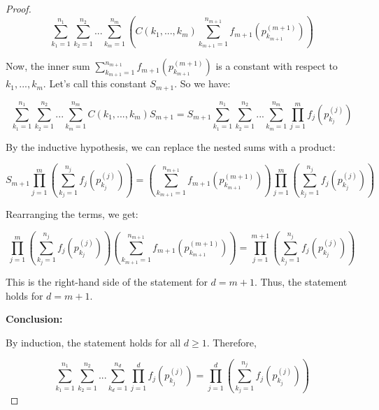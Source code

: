 \begin{proof}
$$
\sum_{k_1=1}^{n_1} \sum_{k_2=1}^{n_2} ... \sum_{k_m=1}^{n_m}  \left( C(k_1, ..., k_m) \sum_{k_{m+1}=1}^{n_{m+1}} f_{m+1}(p_{k_{m+1}}^{(m+1)}) \right)
$$

Now, the inner sum $\sum_{k_{m+1}=1}^{n_{m+1}} f_{m+1}(p_{k_{m+1}}^{(m+1)})$ is a constant with respect to $k_1, ..., k_m$. Let's call this constant $S_{m+1}$. So we have:

$$
\sum_{k_1=1}^{n_1} \sum_{k_2=1}^{n_2} ... \sum_{k_m=1}^{n_m} C(k_1, ..., k_m) S_{m+1} = S_{m+1} \sum_{k_1=1}^{n_1} \sum_{k_2=1}^{n_2} ... \sum_{k_m=1}^{n_m}  \prod_{j=1}^m f_j(p_{k_j}^{(j)})
$$

By the inductive hypothesis, we can replace the nested sums with a product:

$$
S_{m+1} \prod_{j=1}^m \left( \sum_{k_j=1}^{n_j} f_j(p_{k_j}^{(j)}) \right) = \left( \sum_{k_{m+1}=1}^{n_{m+1}} f_{m+1}(p_{k_{m+1}}^{(m+1)}) \right) \prod_{j=1}^m \left( \sum_{k_j=1}^{n_j} f_j(p_{k_j}^{(j)}) \right)
$$

Rearranging the terms, we get:

$$
\prod_{j=1}^m \left( \sum_{k_j=1}^{n_j} f_j(p_{k_j}^{(j)}) \right) \left( \sum_{k_{m+1}=1}^{n_{m+1}} f_{m+1}(p_{k_{m+1}}^{(m+1)}) \right) = \prod_{j=1}^{m+1} \left( \sum_{k_j=1}^{n_j} f_j(p_{k_j}^{(j)}) \right)
$$

This is the right-hand side of the statement for $d = m+1$. Thus, the statement holds for $d = m+1$.

\textbf{Conclusion:}

By induction, the statement holds for all $d \geq 1$. Therefore,

$$
\sum_{k_1=1}^{n_1} \sum_{k_2=1}^{n_2} ... \sum_{k_d=1}^{n_d} \prod_{j=1}^d f_j(p_{k_j}^{(j)}) = \prod_{j=1}^d \left( \sum_{k_j=1}^{n_j} f_j(p_{k_j}^{(j)}) \right)
$$

\end{proof}



